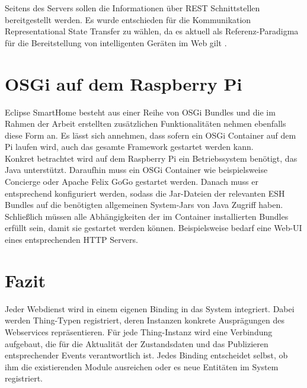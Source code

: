 Seitens des Servers sollen die Informationen über REST Schnittstellen \cite{rest} bereitgestellt werden. Es wurde entschieden für die  Kommunikation Representational State Transfer zu wählen, da es aktuell als Referenz-Paradigma für die Bereitstellung von intelligenten Geräten im Web gilt \cite{gui_rest}.



\section{OSGi auf dem Raspberry Pi}
\label{sec:deploy}
Eclipse SmartHome besteht aus einer Reihe von OSGi Bundles und die im Rahmen der Arbeit erstellten zusätzlichen Funktionalitäten nehmen ebenfalls diese Form an. Es lässt sich annehmen, dass sofern ein OSGi Container auf dem Pi laufen wird, auch das gesamte Framework gestartet werden kann.\\

Konkret betrachtet wird auf dem Raspberry Pi ein Betriebssystem benötigt, das Java unterstützt. Daraufhin muss ein OSGi Container wie beispielsweise Concierge\cite{concierge} oder Apache Felix GoGo\cite{felixgogo} gestartet werden. Danach muss er entsprechend konfiguriert werden, sodass die Jar-Dateien der relevanten ESH Bundles auf die benötigten allgemeinen System-Jars von Java Zugriff haben. Schließlich müssen alle Abhängigkeiten der im Container installierten Bundles erfüllt sein, damit sie gestartet werden können. Beispielsweise bedarf eine Web-UI eines entsprechenden HTTP Servers.


\section{Fazit}
Jeder Webdienst wird in einem eigenen Binding in das System integriert. Dabei werden Thing-Typen registriert, deren Instanzen konkrete Ausprägungen des Webservices repräsentieren. Für jede Thing-Instanz wird eine Verbindung aufgebaut, die für die Aktualität der Zustandsdaten und das Publizieren entsprechender Events verantwortlich ist. Jedes Binding entscheidet selbst, ob ihm die existierenden Module ausreichen oder es neue Entitäten im System registriert. 







